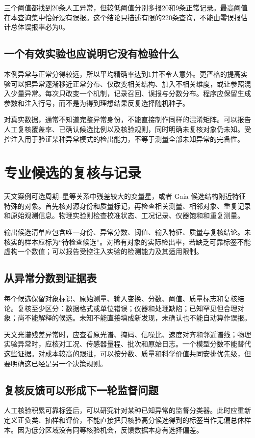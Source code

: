 三个阈值都找到20条人工异常，但较低阈值分别多报20和9条正常记录。最高阈值在本查询集中恰好没有误报。这个结论只描述有限的220条查询，不能由零误报估计总体误报率必为0。

\subsection{一个有效实验也应说明它没有检验什么}
本例异常与正常分得较远，所以平均精确率达到1并不令人意外。更严格的提高实验可以把异常逐渐移近正常分布、仅改变相关结构、加入不相关维度，或让参照混入少量异常。每次只改变一个机制，记录召回、误报与分数分布。程序应保留生成参数和注入行号，而不是为得到理想结果反复选择随机种子。

对真实数据，通常不知道完整异常身份，不能直接制作同样的混淆矩阵。可以报告人工复核覆盖率、已确认候选比例以及核验规则，同时明确未复核对象仍未知。受控注入用于验证某种异常模式的检出能力，不等于测量全部未知异常的完备性。

\section{专业候选的复核与记录}
天文案例可选周期--星等关系中残差较大的变量星，或者 Gaia 候选结构附近特征特殊的对象。首先核对源身份和质量标记，再检查相关测量、相邻对象、重复记录和原始观测信息。物理实验则检查校准状态、工况记录、仪器饱和和重复测量。

输出候选清单应包含唯一身份、异常分数、阈值、输入特征、质量与复核结论。未核实的样本应标为“待检查候选”。对稀有对象的实际检出率，若缺乏可靠标签不能虚构一个数值；可以报告受控注入实验的检测能力及其适用限制。

\subsection{从异常分数到证据表}
每个候选保留对象标识、原始测量、输入变换、分数、阈值、质量标志和复核结论。复核至少区分：数据格式或单位错误；仪器和处理缺陷；已知罕见但合理对象；尚不能解释的候选。未知不能直接填成新发现，未确认也不能自动算作误报。

天文光谱残差异常时，应查看原光谱、掩码、信噪比、速度对齐和邻近谱线；物理实验异常时，应核对工况、传感器量程、批次和原始日志。一个模型分数不能替代这些证据。对成本较高的跟进，可以按分数、质量和科学价值共同安排优先级，但要明确这已经是另一个决策规则。

\subsection{复核反馈可以形成下一轮监督问题}
人工核验积累可靠标签后，可以研究针对某种已知异常的监督分类器。此时应重新定义正负类、抽样和评价，不能直接把只核验高分候选得到的标签当作无偏总体样本。因为低分区域没有同等核验机会，反馈数据本身有选择偏差。

